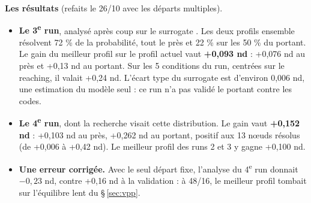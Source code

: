 \documentclass[10pt,a4paper]{article}
\begin{document}
\textbf{Les résultats} (refaits le 26/10 avec les départs multiples).
\begin{itemize}
  \item \textbf{Le 3\textsuperscript{e} run}, analysé après coup sur le surrogate
        . Les deux profils ensemble résolvent 72 \% de la probabilité, tout le
        près et 22 \% sur les 50 \% du portant. Le gain du meilleur profil sur le profil actuel vaut
        \textbf{+0,093 nd} : +0,076 nd au près et +0,13 nd au portant. Sur les 5 conditions du run, centrées
        sur le reaching, il valait +0,24 nd. L'écart type du surrogate est d'environ 0,006 nd, une estimation
        du modèle seul : ce run n'a pas validé le portant contre les codes.
  \item \textbf{Le 4\textsuperscript{e} run}, dont la recherche visait cette distribution. Le gain vaut
        \textbf{+0,152 nd} : +0,103 nd au près, +0,262 nd au portant, positif aux 13 nœuds résolus (de +0,006
        à +0,42 nd). Le meilleur profil des runs 2 et 3 y gagne +0,100 nd.
  \item \textbf{Une erreur corrigée.} Avec le seul départ fixe, l'analyse du 4\textsuperscript{e} run donnait
        $-0{,}23$ nd, contre +0,16 nd à la validation : à 48/16, le meilleur profil tombait sur l'équilibre
        lent du §\,\ref{sec:vpp}.
\end{itemize}

\end{document}
